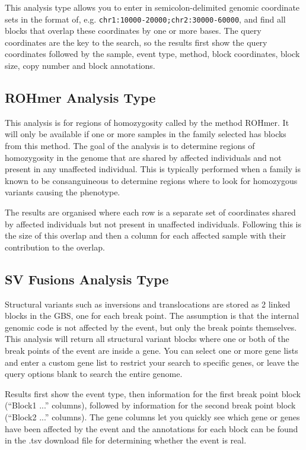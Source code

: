 \documentclass[11pt, a4paper]{article}
\begin{document}
This analysis type allows you to enter in semicolon-delimited genomic coordinate sets in the format of, e.g. \texttt{chr1:10000-20000;chr2:30000-60000}, and find all blocks that overlap these coordinates by one or more bases. The query coordinates are the key to the search, so the results first show the query coordinates followed by the sample, event type, method, block coordinates, block size, copy number and block annotations.

\subsection{ROHmer Analysis Type}

This analysis is for regions of homozygosity called by the method ROHmer. It will only be available if one or more samples in the family selected has blocks from this method. The goal of the analysis is to determine regions of homozygosity in the genome that are shared by affected individuals and not present in any unaffected individual. This is typically performed when a family is known to be consanguineous to determine regions where to look for homozygous variants causing the phenotype.

The results are organised where each row is a separate set of coordinates shared by affected individuals but not present in unaffected individuals. Following this is the size of this overlap and then a column for each affected sample with their contribution to the overlap.

\subsection{SV Fusions Analysis Type}

Structural variants such as inversions and translocations are stored as 2 linked blocks in the GBS, one for each break point. The assumption is that the internal genomic code is not affected by the event, but only the break points themselves. This analysis will return all structural variant blocks where one or both of the break points of the event are inside a gene. You can select one or more gene lists and enter a custom gene list to restrict your search to specific genes, or leave the query options blank to search the entire genome.

Results first show the event type, then information for the first break point block (``Block1 ...'' columns), followed by information for the second break point block (``Block2 ...'' columns). The gene columns let you quickly see which gene or genes have been affected by the event and the annotations for each block can be found in the .tsv download file for determining whether the event is real.

\end{document}
